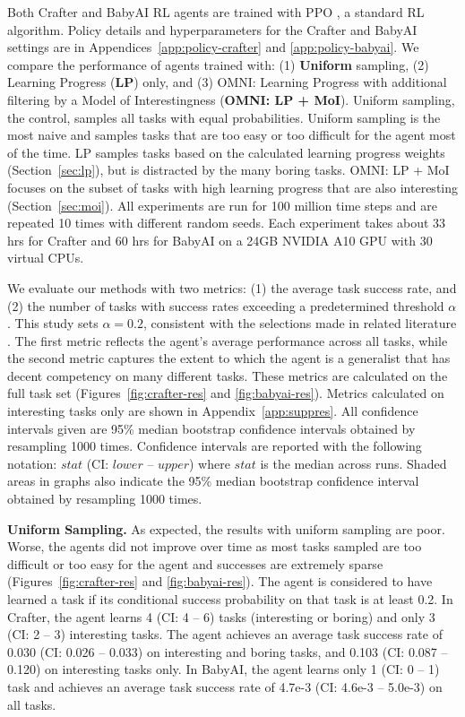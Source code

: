 \documentclass{article} %
\begin{document}
Both Crafter and BabyAI RL agents are trained with PPO \citep{ppo}, a standard RL algorithm. Policy details and hyperparameters for the Crafter and BabyAI settings are in Appendices~\ref{app:policy-crafter} and \ref{app:policy-babyai}. We compare the performance of agents trained with: (1) \textbf{Uniform} sampling, (2) Learning Progress (\textbf{LP}) only, and (3) OMNI: Learning Progress with additional filtering by a Model of Interestingness (\textbf{OMNI: LP + MoI}). Uniform sampling, the control, samples all tasks with equal probabilities. Uniform sampling is the most naive and samples tasks that are too easy or too difficult for the agent most of the time. LP samples tasks based on the calculated learning progress weights (Section~\ref{sec:lp}), but is distracted by the many boring tasks. OMNI: LP + MoI focuses on the subset of tasks with high learning progress that are also interesting (Section~\ref{sec:moi}). All experiments are run for 100 million time steps and are repeated 10 times with different random seeds. Each experiment takes about 33 hrs for Crafter and 60 hrs for BabyAI on a 24GB NVIDIA A10 GPU with 30 virtual CPUs.

We evaluate our methods with two metrics: (1) the average task success rate, and (2) the number of tasks with success rates exceeding a predetermined threshold $\alpha$. This study sets $\alpha = 0.2$, consistent with the selections made in related literature \citep{ingmar, xland2}. The first metric reflects the agent's average performance across all tasks, while the second metric captures the extent to which the agent is a generalist that has decent competency on many different tasks. These metrics are calculated on the full task set (Figures~\ref{fig:crafter-res} and \ref{fig:babyai-res}). Metrics calculated on interesting tasks only are shown in Appendix~\ref{app:suppres}. All confidence intervals given are 95\% median bootstrap confidence intervals obtained by resampling 1000 times. Confidence intervals are reported with the following notation: $stat$ (CI: $lower$ -- $upper$) where $stat$ is the median across runs. Shaded areas in graphs also indicate the 95\% median bootstrap confidence interval obtained by resampling 1000 times.

\textbf{Uniform Sampling.} As expected, the results with uniform sampling are poor. Worse, the agents did not improve over time as most tasks sampled are too difficult or too easy for the agent and successes are extremely sparse (Figures~\ref{fig:crafter-res} and \ref{fig:babyai-res}). The agent is considered to have learned a task if its conditional success probability on that task is at least 0.2. In Crafter, the agent learns 4 (CI: 4 -- 6) tasks (interesting or boring) and only 3 (CI: 2 -- 3) interesting tasks. The agent achieves an average task success rate of 0.030 (CI: 0.026 -- 0.033) on interesting and boring tasks, and 0.103 (CI: 0.087 -- 0.120) on interesting tasks only. In BabyAI, the agent learns only 1 (CI: 0 -- 1) task and achieves an average task success rate of 4.7e-3 (CI: 4.6e-3 -- 5.0e-3) on all tasks.
\end{document}
